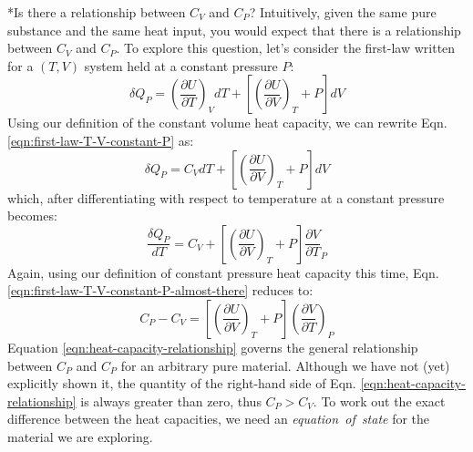 \documentclass[11pt]{article}
\makeatletter
\theoremstyle{definition}
\renewcommand\subsubsection{\@startsection
	{subsubsection}{2}{0mm}
	{-0.05in}
	{-0.5\baselineskip}
	{\normalfont\normalsize\itshape}}
\makeatother
\begin{document}
\subsubsection*{Is there a relationship between $C_{V}$ and $C_{P}$?}
Intuitively, given the same pure substance and the same heat input, you would expect that there is a relationship between $C_{V}$ and $C_{P}$.
To explore this question, let's consider the first-law written for a $(T,V)$ system held at a constant pressure $P$:
\begin{equation}\label{eqn:first-law-T-V-constant-P}
	\delta{Q}_{P} = \left(\frac{\partial{U}}{\partial{T}}\right)_{V}dT + \left[\left(\frac{\partial{U}}{\partial{V}}\right)_{T} + P\right]dV
\end{equation}Using our definition of the constant volume heat capacity, we can rewrite Eqn. \eqref{eqn:first-law-T-V-constant-P} as:
\begin{equation}
	\delta{Q}_{P} = C_{V}dT + \left[\left(\frac{\partial{U}}{\partial{V}}\right)_{T} + P\right]dV
\end{equation}which, after differentiating with respect to temperature at a constant pressure becomes:
\begin{equation}\label{eqn:first-law-T-V-constant-P-almost-there}
	\frac{\delta{Q}_{P}}{dT} = C_{V} + \left[\left(\frac{\partial{U}}{\partial{V}}\right)_{T} + P\right]\frac{\partial{V}}{\partial{T}}_{P}
\end{equation}Again, using our definition of constant pressure heat capacity this time, Eqn. \eqref{eqn:first-law-T-V-constant-P-almost-there} reduces to:
\begin{equation}\label{eqn:heat-capacity-relationship}
	C_{P} - C_{V} = \left[\left(\frac{\partial{U}}{\partial{V}}\right)_{T} + P\right]\left(\frac{\partial{V}}{\partial{T}}\right)_{P}
\end{equation}
Equation \eqref{eqn:heat-capacity-relationship} governs the general relationship between $C_{P}$ and $C_{P}$ for an arbitrary pure material.
Although we have not (yet) explicitly shown it, the quantity of the right-hand side of Eqn. \eqref{eqn:heat-capacity-relationship} is always greater than zero, thus $C_{P}>{C_{V}}$.
To work out the exact difference between the heat capacities, we need an \textit{equation~of~state} for the material we are exploring.
\end{document}
